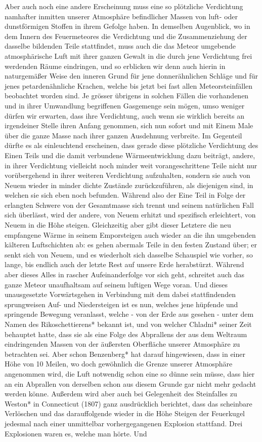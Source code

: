 \documentclass[a4paper, 8pt, oneside, polutonikogreek, german]{article}
\begin{document}
Aber auch noch eine andere Erscheinung muss eine so plötzliche Verdichtung namhafter inmitten unserer Atmosphäre befindlicher Massen von luft- oder dunstförmigen Stoffen in ihrem Gefolge haben. In demselben Augenblick, wo in dem Innern des Feuermeteores die Verdichtung und die Zusammenziehung der dasselbe bildenden Teile stattfindet, muss auch die das Meteor umgebende atmosphärische Luft mit ihrer ganzen Gewalt in die durch jene Verdichtung frei werdenden Räume eindringen, und so erblicken wir denn auch hierin in naturgemäßer Weise den inneren Grund für jene donnerähnlichen Schläge und für jenes petardenähnliche Krachen, welche bis jetzt bei fast allen Meteorsteinfällen beobachtet worden sind. Je grösser übrigens in solchen Fällen die vorhandenen und in ihrer Umwandlung begriffenen Gasgemenge sein mögen, umso weniger dürfen wir erwarten, dass ihre Verdichtung, auch wenn sie wirklich bereits an irgendeiner Stelle ihren Anfang genommen, sich nun sofort und mit Einem Male über die ganze Masse nach ihrer ganzen Ausdehnung verbreite. Im Gegenteil dürfte es als einleuchtend erscheinen, dass gerade diese plötzliche Verdichtung des Einen Teils und die damit verbundene Wärmeentwicklung dazu beiträgt, andere, in ihrer Verdichtung vielleicht noch minder weit vorangeschrittene Teile nicht nur vorübergehend in ihrer weiteren Verdichtung aufzuhalten, sondern sie auch von Neuem wieder in minder dichte Zustände zurückzuführen, als diejenigen sind, in welchen sie sich eben noch befunden. Während also der Eine Teil in Folge der erlangten Schwere von der Gesamtmasse sich trennt und seinem natürlichen Fall sich überlässt, wird der andere, von Neuem erhitzt und spezifisch erleichtert, von Neuem in die Höhe steigen. Gleichzeitig aber gibt dieser Letztere die neu empfangene Wärme in seinem Emporsteigen auch wieder an die ihn umgebenden kälteren Luftschichten ab: es gehen abermals Teile in den festen Zustand über; er senkt sich von Neuem, und es wiederholt sich dasselbe Schauspiel wie vorher, so lange, bis endlich auch der letzte Rest auf unsere Erde herabstürzt. Während aber dieses Alles in rascher Aufeinanderfolge vor sich geht, schreitet auch das ganze Meteor unaufhaltsam auf seinem luftigen Wege voran. Und dieses unausgesetzte Vorwärtsgehen in Verbindung mit dem dabei stattfindenden sprungweisen Auf- und Niedersteigen ist es nun, welches jene hüpfende und springende Bewegung veranlasst, welche - von der Erde aus gesehen - unter dem Namen des Rikoschettierens* bekannt ist, und von welcher Chladni* seiner Zeit behauptet hatte, dass sie als eine Folge des Abprallens der aus dem Weltraum eindringenden Massen von der äußersten Oberfläche unserer Atmosphäre zu betrachten sei. Aber schon Benzenberg* hat darauf hingewiesen, dass in einer Höhe von 10 Meilen, wo doch gewöhnlich die Grenze unserer Atmosphäre angenommen wird, die Luft notwendig schon eine so dünne sein müsse, dass hier an ein Abprallen von derselben schon aus diesem Grunde gar nicht mehr gedacht werden könne. Außerdem wird aber auch bei Gelegenheit des Steinfalles zu Weston* in Connecticut (1807) ganz ausdrücklich berichtet, dass das scheinbare Verlöschen und das darauffolgende wieder in die Höhe Steigen der Feuerkugel jedesmal nach einer unmittelbar vorhergegangenen Explosion stattfand. Drei Explosionen waren es, welche man hörte. Und 
\end{document}
